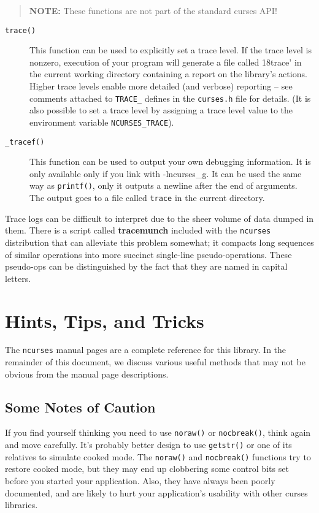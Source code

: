 \label{f0:debugging}%
\begin{quotation} \textbf{NOTE:} These functions are not part of the standard curses API!\end{quotation}
\begin{description}
\item[ \texttt{trace()}] 
This function can be used to explicitly set a trace level.  If the
trace level is nonzero, execution of your program will generate a file
called \char18trace' in the current working directory containing a report on
the library's actions.  Higher trace levels enable more detailed (and
verbose) reporting -- see comments attached to \texttt{TRACE\_} defines
in the \texttt{curses.h} file for details.  (It is also possible to set
a trace level by assigning a trace level value to the environment variable
\texttt{NCURSES\_TRACE}).
\item[ \texttt{\_tracef()}] 
This function can be used to output your own debugging information.  It is only
available only if you link with -lncurses\_g.  It can be used the same way as
\texttt{printf()}, only it outputs a newline after the end of arguments.
The output goes to a file called \texttt{trace} in the current directory.
\end{description}
Trace logs can be difficult to interpret due to the sheer volume of
data dumped in them.  There is a script called \textbf{tracemunch}
included with the \texttt{ncurses} distribution that can alleviate
this problem somewhat; it compacts long sequences of similar operations into
more succinct single-line pseudo-operations. These pseudo-ops can be
distinguished by the fact that they are named in capital letters.

\section{Hints, Tips, and Tricks}

\label{f0:hints}The \texttt{ncurses} manual pages are a complete reference for this library.
In the remainder of this document, we discuss various useful methods that
may not be obvious from the manual page descriptions.

\subsection{Some Notes of Caution}

\label{f0:caution}If you find yourself thinking you need to use \texttt{noraw()} or
\texttt{nocbreak()}, think again and move carefully.  It's probably
better design to use \texttt{getstr()} or one of its relatives to
simulate cooked mode.  The \texttt{noraw()} and \texttt{nocbreak()}
functions try to restore cooked mode, but they may end up clobbering
some control bits set before you started your application.  Also, they
have always been poorly documented, and are likely to hurt your
application's usability with other curses libraries. 

